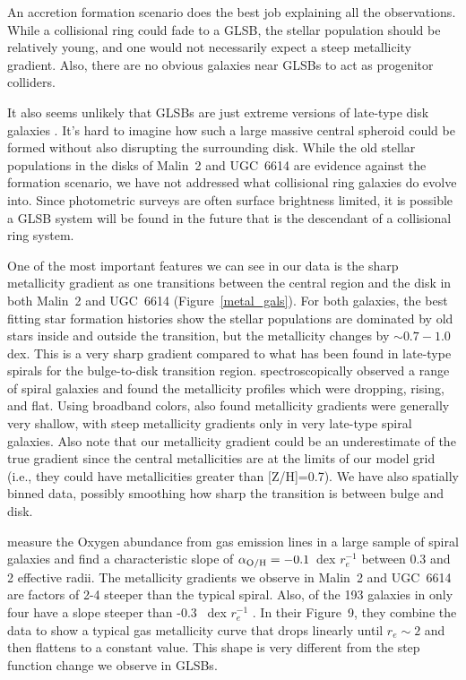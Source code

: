 \documentclass[12pt,preprint]{aastex}
\begin{document}
An accretion formation scenario does the best job explaining all the observations.
While a collisional ring could fade to a GLSB, the stellar population should be relatively young, and one would not necessarily expect a steep metallicity gradient.
Also, there are no obvious galaxies near GLSBs to act as progenitor colliders.


It also seems unlikely that GLSBs are just extreme versions of late-type disk galaxies \citep{Das13}.
It's hard to imagine how such a large massive central spheroid could be formed without also disrupting the surrounding disk.
While the old stellar populations in the disks of Malin~2 and UGC~6614 are evidence against the \citet{Mapelli08} formation scenario, we have not addressed what collisional ring galaxies do evolve into.
Since photometric surveys are often surface brightness limited, it is possible a GLSB system will be found in the future that is the descendant of a collisional ring system.


One of the most important features we can see in our data is the sharp metallicity gradient as one transitions between the central region and the disk in both Malin~2 and UGC~6614 (Figure~\ref{metal_gals}).
For both galaxies, the best fitting star formation histories show the stellar populations are dominated by old stars inside and outside the transition, but the metallicity changes by $\sim0.7-1.0$ dex.
This is a very sharp gradient compared to what has been found in late-type spirals for the bulge-to-disk transition region.
\citet{MacArthur09} spectroscopically observed a range of spiral galaxies and found the metallicity profiles which were dropping, rising, and flat.
Using broadband colors, \citet{MacArthur04} also found metallicity gradients were generally very shallow, with steep metallicity gradients only in very late-type spiral galaxies. Also note that our metallicity gradient could be an underestimate of the true gradient since the central metallicities are at the limits of our model grid (i.e., they could have metallicities greater than [Z/H]=0.7). We have also spatially binned data, possibly smoothing how sharp the transition is between bulge and disk.

\citet{Sanchez14} measure the Oxygen abundance from gas emission lines in a large sample of spiral galaxies and find a characteristic slope of $\alpha_{\rm{O/H}} = -0.1$\ dex $r_e^{-1}$ between 0.3 and 2 effective radii.
The metallicity gradients we observe in Malin~2 and UGC~6614 are factors of 2-4 steeper than the typical spiral. Also, of the 193 galaxies in \citet{Sanchez14} only four have a slope steeper than -0.3 \ dex $r_e^{-1}$ \citep[Figure~6]{Sanchez14}.
In their Figure~9, they combine the data to show a typical gas metallicity curve that drops linearly until $r_e\sim2$ and then flattens to a constant value. This shape is very different from the step function change we observe in GLSBs.
\end{document}
